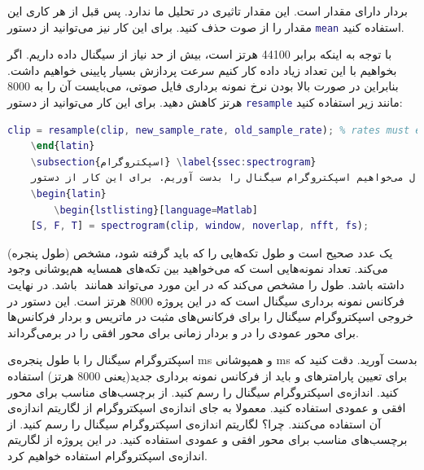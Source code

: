 \documentclass{utsignal}
\begin{document}
	بردار  دارای مقدار  است. این مقدار تاثیری در تحلیل ما ندارد. پس قبل از هر کاری این مقدار را از صوت حذف کنید. برای این کار نیز می‌توانید از دستور \lstinline[language=Matlab]{mean} استفاده کنید.
	
	با توجه به اینکه  برابر 44100 هرتز است، بیش از حد نیاز از سیگنال داده داریم. اگر بخواهیم با این تعداد زیاد داده کار کنیم سرعت پردازش بسیار پایینی خواهیم داشت. بنابراین در صورت بالا بودن نرخ نمونه برداری فایل صوتی، می‌بایست آن را به 8000 هرتز کاهش دهید. برای این کار می‌توانید از دستور \lstinline[language=Matlab]{resample} مانند زیر استفاده کنید:
	\begin{latin}
		\begin{lstlisting}[language=Matlab]
	clip = resample(clip, new_sample_rate, old_sample_rate); % rates must each be integers.\end{lstlisting}
	\end{latin}
	\subsection{اسپکتروگرام} \label{ssec:spectrogram}
	حال می‌خواهیم اسپکتروگرام سیگنال را بدست آوریم. برای این کار از دستور \lstinline[language=Matlab]{spectrogram} استفاده کنید. با این دستور در تمرین کامپیوتری دوم آشنا شدید. این دستور را به شکل زیر استفاده کنید:
	\begin{latin}
		\begin{lstlisting}[language=Matlab]
	[S, F, T] = spectrogram(clip, window, noverlap, nfft, fs);\end{lstlisting}
	\end{latin}
	 (طول پنجره) یک عدد صحیح است و طول تکه‌هایی را که باید   گرفته شود، مشخص می‌کند.  تعداد نمونه‌هایی است که می‌خواهید بین تکه‌های همسایه هم‌پوشانی وجود داشته باشد.  طول  را مشخص می‌کند که در این مورد می‌تواند همانند ‌ باشد. در نهایت  فرکانس نمونه برداری سیگنال است که در این پروژه 8000 هرتز است. این دستور در خروجی اسپکتروگرام سیگنال را برای فرکانس‌های مثبت در ماتریس  و بردار فرکانس‌ها برای محور عمودی را در  و بردار زمانی برای محور افقی را در  برمی‌گرداند.
	
	اسپکتروگرام سیگنال را با طول پنجره‌ی ms و همپوشانی ms بدست آورید. دقت کنید که برای تعیین پارامتر‌های  و  باید از فرکانس نمونه برداری جدید(یعنی 8000 هرتز) استفاده کنید. اندازه‌ی اسپکتروگرام سیگنال را رسم کنید. از برچسب‌های مناسب برای محور افقی و عمودی استفاده کنید. معمولا به جای اندازه‌ی اسپکتروگرام از لگاریتم اندازه‌ی آن استفاده می‌کنند. چرا؟ لگاریتم اندازه‌ی اسپکتروگرام سیگنال را رسم کنید. از برچسب‌های مناسب برای محور افقی و عمودی استفاده کنید. در این پروژه از لگاریتم اندازه‌ی اسپکتروگرام استفاده خواهیم کرد.
\end{document}
